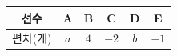 {\renewcommand{\arraystretch}{1.35}\small
\begin{tabular}{|c|c|c|c|c|c|}
\hline
선수 & A & B & C & D & E \\ \hline
편차(개) & $a$ & $4$ & $-2$ & $b$ & $-1$ \\ \hline
\end{tabular}}

